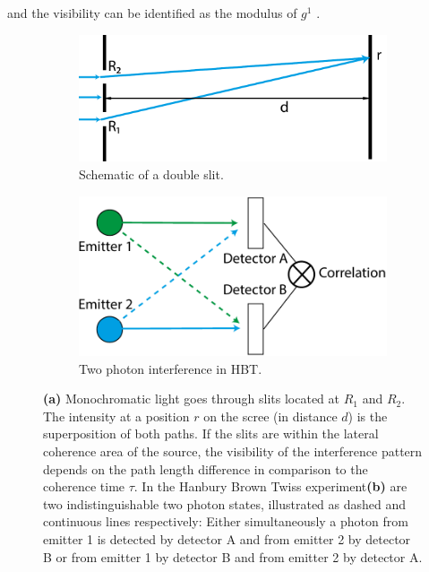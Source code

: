 and the visibility can be identified as the modulus of $g^1$ \cite{loudon2000,ou2017}.

\begin{figure}
	\centering
	\begin{subfigure}[b]{0.53\textwidth}
	\includegraphics[width=\linewidth]{images/doubleslit.pdf}
	\caption[Schematic of a lit]{Schematic of a double slit.}
	\label{fig:doubleslit}
	\end{subfigure}
\begin{subfigure}[b]{0.41\textwidth}
	\includegraphics[width=\linewidth]{images/correlation.pdf}
	\caption{Two photon interference in HBT.}
	\label{fig:twophoton}
\end{subfigure}
\caption[Schematic of a double slit and two photon interference in  HBT experiments]{\textbf{(a)} Monochromatic light goes through slits located at $R_1$ and $R_2$. The intensity at a position $r$ on the scree (in distance $d$) is the superposition of both paths.  If the slits are within the lateral coherence area of the source, the visibility of the interference pattern depends on the path length difference in comparison to the coherence time $\tau$.
In the Hanbury Brown Twiss experiment\textbf{(b)} are two indistinguishable two photon states, illustrated as dashed and  continuous lines respectively: Either simultaneously a photon from emitter 1 is detected by detector A and from emitter 2 by detector B or from emitter 1 by detector B and from emitter 2 by detector A.}
\end{figure}



